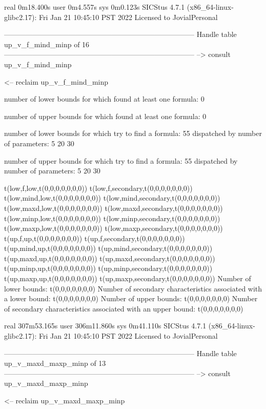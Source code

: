 real	0m18.400s
user	0m4.557s
sys	0m0.123s
SICStus 4.7.1 (x86_64-linux-glibc2.17): Fri Jan 21 10:45:10 PST 2022
Licensed to JovialPersonal


--------------------------------------------------------------------------------
Handle table up_v_f_mind_minp of 16
--------------------------------------------------------------------------------
--> consult up_v_f_mind_minp

<-- reclaim up_v_f_mind_minp

number of lower bounds for which found at least one formula: 0

number of upper bounds for which found at least one formula: 0

number of lower bounds for which try to find a formula: 55
dispatched by number of parameters: 5  20  30

number of upper bounds for which try to find a formula: 55
dispatched by number of parameters: 5  20  30

t(low,f,low,t(0,0,0,0,0,0,0))
t(low,f,secondary,t(0,0,0,0,0,0,0))
t(low,mind,low,t(0,0,0,0,0,0,0))
t(low,mind,secondary,t(0,0,0,0,0,0,0))
t(low,maxd,low,t(0,0,0,0,0,0,0))
t(low,maxd,secondary,t(0,0,0,0,0,0,0))
t(low,minp,low,t(0,0,0,0,0,0,0))
t(low,minp,secondary,t(0,0,0,0,0,0,0))
t(low,maxp,low,t(0,0,0,0,0,0,0))
t(low,maxp,secondary,t(0,0,0,0,0,0,0))
t(up,f,up,t(0,0,0,0,0,0,0))
t(up,f,secondary,t(0,0,0,0,0,0,0))
t(up,mind,up,t(0,0,0,0,0,0,0))
t(up,mind,secondary,t(0,0,0,0,0,0,0))
t(up,maxd,up,t(0,0,0,0,0,0,0))
t(up,maxd,secondary,t(0,0,0,0,0,0,0))
t(up,minp,up,t(0,0,0,0,0,0,0))
t(up,minp,secondary,t(0,0,0,0,0,0,0))
t(up,maxp,up,t(0,0,0,0,0,0,0))
t(up,maxp,secondary,t(0,0,0,0,0,0,0))
Number of lower bounds:                                             t(0,0,0,0,0,0,0)
Number of secondary characteristics associated with a lower bound:  t(0,0,0,0,0,0,0)
Number of upper bounds:                                             t(0,0,0,0,0,0,0)
Number of secondary characteristics associated with an upper bound: t(0,0,0,0,0,0,0)

real	307m53.165s
user	306m11.860s
sys	0m41.110s
SICStus 4.7.1 (x86_64-linux-glibc2.17): Fri Jan 21 10:45:10 PST 2022
Licensed to JovialPersonal


--------------------------------------------------------------------------------
Handle table up_v_maxd_maxp_minp of 13
--------------------------------------------------------------------------------
--> consult up_v_maxd_maxp_minp

<-- reclaim up_v_maxd_maxp_minp

